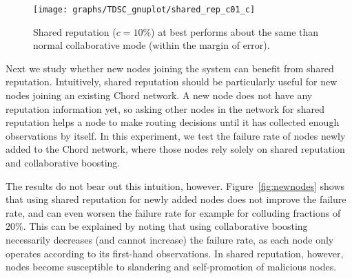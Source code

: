 \begin{figure}[t!]
\centering 
\texttt{[image: graphs/TDSC\_gnuplot/shared\_rep\_c01\_c]}
\caption{Shared reputation ($c=10\%$) at best performs about the same
   than normal collaborative mode (within the margin of error).}
      \label{fig:shared0.1}
\end{figure}


















 Next we study whether new nodes joining the
system can benefit from shared reputation.
Intuitively, shared reputation should be particularly useful for new
nodes joining an existing Chord network. A new node does not have any
reputation information yet, so asking other nodes in the network for
shared reputation helps a node to make routing decisions until it has
collected enough observations by itself. In this experiment, we test the
failure rate of nodes newly added to the Chord network, where those
nodes rely solely on shared reputation and collaborative boosting.



The results do not bear out this intuition,
however. Figure~\ref{fig:newnodes} shows that using shared reputation
for newly added nodes does not improve the failure rate, and can even
worsen the failure rate for example for colluding fractions of
$20\%$. This can be explained by noting that using collaborative
boosting necessarily decreases (and cannot increase) the failure rate,
as each node only operates according to its first-hand observations. In
shared reputation, however, nodes become susceptible to slandering and
self-promotion of malicious nodes.






















